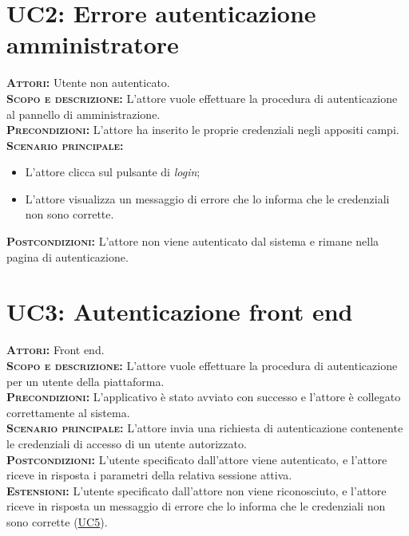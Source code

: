 \section{UC2: Errore autenticazione amministratore}
\label{sec:uc2}
\textsc{\textbf{Attori:}} Utente non autenticato.\\
\textsc{\textbf{Scopo e descrizione:}} L'attore vuole effettuare la procedura di autenticazione al pannello di amministrazione.\\
\textsc{\textsc{\textbf{Precondizioni:}}} L'attore ha inserito le proprie credenziali negli appositi campi.\\
\textsc{\textbf{Scenario principale:}}
\begin{itemize}
    \item L'attore clicca sul pulsante di \textit{login};
    \item L'attore visualizza un messaggio di errore che lo informa che le credenziali non sono corrette.
\end{itemize}
\textsc{\textbf{Postcondizioni:}} L'attore non viene autenticato dal sistema e rimane nella pagina di autenticazione.

\section{UC3: Autenticazione front end}
\label{sec:uc3}
\textsc{\textbf{Attori:}} Front end.\\
\textsc{\textbf{Scopo e descrizione:}} L'attore vuole effettuare la procedura di autenticazione per un utente della piattaforma.\\
\textsc{\textsc{\textbf{Precondizioni:}}} L'applicativo è stato avviato con successo e l'attore è collegato correttamente al sistema.\\
\textsc{\textbf{Scenario principale:}} L'attore invia una richiesta di autenticazione contenente le credenziali di accesso di un utente autorizzato.\\
\textsc{\textbf{Postcondizioni:}} L'utente specificato dall'attore viene autenticato, e l'attore riceve in risposta i parametri della relativa sessione attiva.\\
\textsc{\textbf{Estensioni:}}  L'utente specificato dall'attore non viene riconosciuto, e l'attore riceve in risposta un messaggio di errore che lo informa che le credenziali non sono corrette (\hyperref[sec:UC5]{UC5}).

